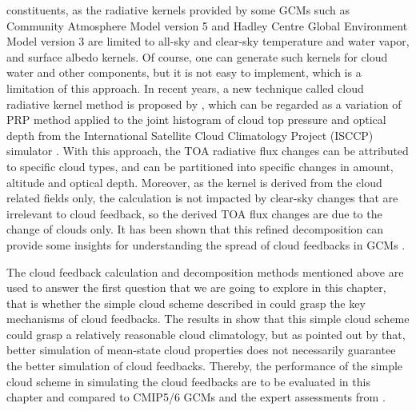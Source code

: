 constituents, as the radiative kernels provided by some GCMs such as Community Atmosphere Model version 5 \citep[ CAM5;][]{Pendergrass2018} and Hadley Centre Global Environment Model version 3 \citep[HadGEM3;][]{Smith2020} are limited to all-sky and clear-sky temperature and water vapor, and surface albedo kernels. Of course, one can generate such kernels for cloud water and other components, but it is not easy to implement, which is a limitation of this approach. In recent years, a new technique called cloud radiative kernel method is proposed by \cite{Zelinka2012computing1,Zelinka2012computing2}, which can be regarded as a variation of PRP method applied to the joint histogram of cloud top pressure and optical depth from the International Satellite Cloud Climatology Project (ISCCP) simulator \citep{Klein1999validation,Webb2001combining}. With this approach, the TOA radiative flux changes can be attributed to specific cloud types, and can be partitioned into specific changes in amount, altitude and optical depth. Moreover, as the kernel is derived from the cloud related fields only, the calculation is not impacted by clear-sky changes that are irrelevant to cloud feedback, so the derived TOA flux changes are due to the change of clouds only. It has been shown that this refined decomposition can provide some insights for understanding the spread of cloud feedbacks in GCMs \citep[e.g.,][]{Zelinka2016insights,Zelinka2020causes,Zelinka2021evaluating}.

The cloud feedback calculation and decomposition methods mentioned above are used to answer the first question that we are going to explore in this chapter, that is whether the simple cloud scheme described in  could grasp the key mechanisms of cloud feedbacks. The results in  show that this simple cloud scheme could grasp a relatively reasonable cloud climatology, but as pointed out by \cite{Zelinka2021evaluating} that, better simulation of mean-state cloud properties does not necessarily guarantee the better simulation of cloud feedbacks. Thereby, the performance of the simple cloud scheme in simulating the cloud feedbacks are to be evaluated in this chapter and compared to CMIP5/6 GCMs and the expert assessments from \cite{Sherwood2020}.

